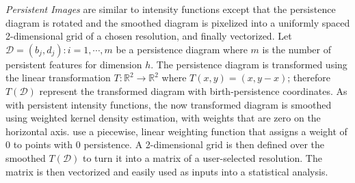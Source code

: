 \documentclass[12pt]{article}
\begin{document}
\emph{Persistent Images} are similar to intensity functions \citep{adams2015persistent} except that the persistence diagram is rotated and the smoothed diagram is pixelized into a uniformly spaced 2-dimensional grid of a chosen resolution, and finally vectorized.  Let $\mathcal{D} = {(b_{j} , d_{j}) : i = 1, \cdots ,m}$ be a persistence diagram where $m$ is the number of persistent features for dimension $h$.  The persistence diagram is transformed using the linear transformation $T: \mathbb{R}^{2} \rightarrow \mathbb{R}^{2}$ where $T(x,y) = (x, y-x)$; therefore $T(\mathcal{D})$ represent the transformed diagram with birth-persistence coordinates.  As with persistent intensity functions, the now transformed diagram is smoothed using weighted kernel density estimation, with weights that are zero on the horizontal axis.  \cite{adams2015persistent} use a piecewise, linear weighting function that assigns a weight of 0 to points with 0 persistence.
A 2-dimensional grid is then defined over the smoothed $T(\mathcal D)$ to turn it into a matrix of a user-selected resolution.  The matrix is then vectorized and easily used as inputs into a statistical analysis.
\end{document}

